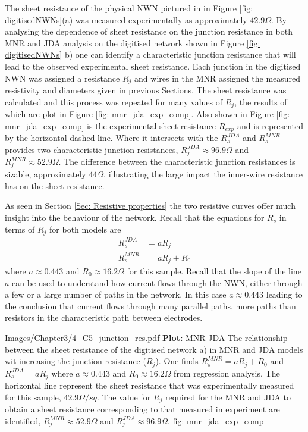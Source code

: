 The sheet resistance of the physical NWN pictured in in Figure \ref{fig: digitisedNWNs}(a) was measured experimentally as approximately $42.9 \Omega$. By analysing the dependence of sheet resistance on the junction resistance in both MNR and JDA analysis on the digitised network shown in Figure \ref{fig: digitisedNWNs} b) one can identify a characteristic junction resistance that will lead to the observed experimental sheet resistance. Each junction in the digitised NWN was assigned a resistance $R_j$ and wires in the MNR assigned the measured resistivity and diameters given in previous Sections. The sheet resistance was calculated and this process was repeated for many values of $R_j$, the results of which are plot in Figure \ref{fig: mnr_jda_exp_comp}. Also shown in Figure \ref{fig: mnr_jda_exp_comp} is the experimental sheet resistance $R_{exp}$ and is represented by the horizontal dashed line. Where it intersects with the $R_s^{JDA}$ and $R_s^{MNR}$ provides two characteristic junction resistances, $R_j^{JDA} \approx 96.9 \Omega$  and $R_j^{MNR} \approx 52.9 \Omega$. The difference between the characteristic junction resistances is sizable, approximately $44\Omega$, illustrating the large impact the inner-wire resistance has on the sheet resistance.

As seen in Section \ref{Sec: Resistive properties}  the two resistive curves offer much insight into the behaviour of the network. Recall that the equations for $R_s$ in terms of $R_j$ for both models are
\begin{align}
R_s^{JDA} &= a R_j\\
R_s^{MNR} &= a R_j+ R_0
\label{eq: rs_linear}
\end{align}
where $a \approx 0.443$ and $R_0 \approx 16.2 \Omega$ for this sample. Recall that the slope of the line $a$ can be used to understand how current flows through the NWN, either through a few or a large number of paths in the network. In this case $a \approx 0.443$ leading to the conclusion that current flows through many parallel paths, more paths than resistors in the characteristic path between electrodes. 

{Images/Chapter3/4_C5_junction_res.pdf}
{\textbf{Plot:} MNR JDA }
{The relationship between the sheet resistance of the digitised network \label{fig: digitisedNWNs} a) in MNR and JDA models wit increasing the junction resistance ($R_j$). One finds $R_s^{MNR} = a R_j + R_0$ and $R_s^{JDA} = a R_j$ where $a \approx 0.443$ and $R_0 \approx 16.2 \Omega$ from regression analysis. The horizontal line represent the sheet resistance that was experimentally measured for this sample, $42.9 \Omega/sq$. The value for $R_j$ required for the MNR and JDA to obtain a sheet resistance corresponding to that measured in experiment are identified, $R_j^{MNR} \approx 52.9 \Omega$ and $R_j^{JDA} \approx 96.9 \Omega$.}
{fig: mnr_jda_exp_comp}

